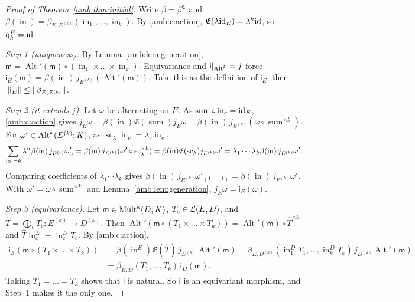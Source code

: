 \begin{proof}[Proof of Theorem~\ref{amb:thm:initial}]
Write $\beta=\beta^{\mathfrak E}$ and $\beta(\operatorname{in})=\beta_{E,E^{(k)}}(\operatorname{in}_1,\dots,\operatorname{in}_k)$. By \eqref{amb:c:action}, $\mathfrak E(\lambda\mathrm{id}_E)=\lambda^k\mathrm{id}$, so $\mathsf q_k^E=\mathrm{id}$.

\emph{Step 1 (uniqueness).} By Lemma~\ref{amb:lem:generation}, $\mathsf m=\operatorname{Alt}'(\mathsf m)\circ(\operatorname{in}_1\times\dots\times\operatorname{in}_k)$. Equivariance and $\mathsf i|_{\operatorname{Alt}^k}=j$ force $\mathsf i_E(\mathsf m)=\beta(\operatorname{in})\,j_{E^{(k)}}(\operatorname{Alt}'(\mathsf m))$. Take this as the definition of $\mathsf i_E$; then $\lVert \mathsf i_E\rVert\le\lVert \beta_{E,E^{(k)}}\rVert$.

\emph{Step 2 (it extends $j$).} Let $\omega$ be alternating on $E$. As $\operatorname{sum}\circ\operatorname{in}_c=\mathrm{id}_E$, \eqref{amb:c:action} gives $j_E\omega=\beta(\operatorname{in})\mathfrak E(\operatorname{sum})j_E\omega=\beta(\operatorname{in})\,j_{E^{(k)}}(\omega\circ\operatorname{sum}^{\times k})$. For $\omega'\in\operatorname{Alt}^k(E^{(k)};K)$, as $\operatorname{sc}_\lambda\operatorname{in}_c=\lambda_c\operatorname{in}_c$,
\[
 \sum_{\lvert \alpha\rvert=k}\lambda^\alpha\beta(\operatorname{in})\,j_{E^{(k)}}\omega'_\alpha=\beta(\operatorname{in})\,j_{E^{(k)}}(\omega'\circ\operatorname{sc}_\lambda^{\times k})=\beta(\operatorname{in})\mathfrak E(\operatorname{sc}_\lambda)j_{E^{(k)}}\omega'=\lambda_1\cdots\lambda_k\beta(\operatorname{in})\,j_{E^{(k)}}\omega'.
\]
Comparing coefficients of $\lambda_1\cdots\lambda_k$ gives $\beta(\operatorname{in})\,j_{E^{(k)}}\omega'_{(1,\dots,1)}=\beta(\operatorname{in})\,j_{E^{(k)}}\omega'$. With $\omega'=\omega\circ\operatorname{sum}^{\times k}$ and Lemma~\ref{amb:lem:generation}, $j_E\omega=\mathsf i_E(\omega)$.

\emph{Step 3 (equivariance).} Let $\mathsf m\in\operatorname{Mult}^k(D;K)$, $T_c\in\mathcal L(E,D)$, and $\widehat T=\bigoplus_cT_c\colon E^{(k)}\to D^{(k)}$. Then $\operatorname{Alt}'(\mathsf m\circ(T_1\times\dots\times T_k))=\operatorname{Alt}'(\mathsf m)\circ\widehat T^{\times k}$ and $\widehat T\operatorname{in}_c^E=\operatorname{in}_c^DT_c$. By \eqref{amb:c:action},
\begin{align*}
 \mathsf i_E(\mathsf m\circ(T_1\times\dots\times T_k))&=\beta(\operatorname{in}^E)\mathfrak E(\widehat T)\,j_{D^{(k)}}\operatorname{Alt}'(\mathsf m)=\beta_{E,D^{(k)}}(\operatorname{in}^D_1T_1,\dots,\operatorname{in}^D_kT_k)\,j_{D^{(k)}}\operatorname{Alt}'(\mathsf m)\\
 &=\beta_{E,D}(T_1,\dots,T_k)\,\mathsf i_D(\mathsf m).
\end{align*}
Taking $T_1=\dots=T_k$ shows that $\mathsf i$ is natural. So $\mathsf i$ is an equivariant morphism, and Step~1 makes it the only one.


\end{proof}
